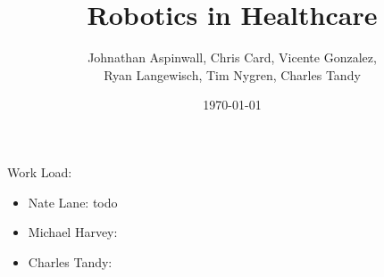 \documentclass[12pt,conference]{IEEEtran}
\title{Robotics in Healthcare}
\date{\today}
\author{Johnathan Aspinwall, Chris Card, Vicente Gonzalez, \\
Ryan Langewisch, Tim Nygren, Charles Tandy}
\begin{document}
\maketitle
\thispagestyle{plain}
\pagestyle{plain}





\appendix
Work Load:
\begin{itemize}
\item Nate Lane: todo
\item Michael Harvey:
\item Charles Tandy: 
\end{itemize}
\end{document}

